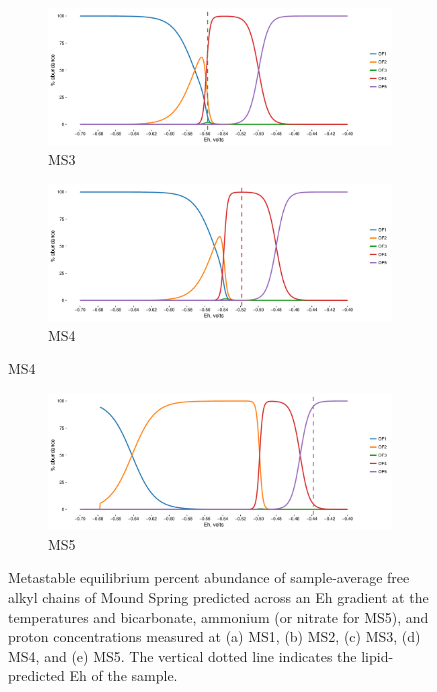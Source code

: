 \begin{figure}[h]\ContinuedFloat
\centering

    \begin{subfigure}[b]{\linewidth}
       	\includegraphics[width=1\linewidth]{"figs_app2/Mound OF3_thermo"}
       	\caption{MS3}
        \label{fig:MS3_thermo}
    \end{subfigure}
    \begin{subfigure}[b]{\linewidth}
    	\includegraphics[width=1\linewidth]{"figs_app2/Mound OF4_thermo"}
    	\caption{MS4}
        \label{fig:MS4_thermo}
    \end{subfigure}
    
\end{figure}

\newpage

\begin{figure}[h]\ContinuedFloat

    \begin{subfigure}[b]{\linewidth}
    	\includegraphics[width=\linewidth]{"figs_app2/Mound OF5_thermo"}
    	\caption{MS5}
        \label{fig:MS5_thermo}
    \end{subfigure}
    
    \caption{Metastable equilibrium percent abundance of sample-average free alkyl chains of Mound Spring predicted across an Eh gradient at the temperatures and bicarbonate, ammonium (or nitrate for MS5), and proton concentrations measured at (a) MS1, (b) MS2, (c) MS3, (d) MS4, and (e) MS5. The vertical dotted line indicates the lipid-predicted Eh of the sample.}
    \label{fig:MS_thermo}
\end{figure}

